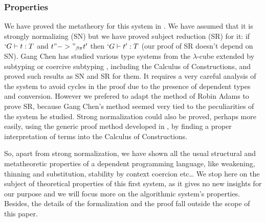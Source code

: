 \documentclass{llncs}
\begin{document}
\subsubsection{Properties}
We have proved the metatheory for this system in \Coq{}
\cite{sozeau:Coq/Russell/meta-web}. We have assumed that it is strongly
normalizing (SN) but we have proved subject reduction (SR) for it: 
if $`G \vdash t : T$ and $t "->"_{\beta\pi} t'$ then $`G \vdash t' :
T$ (our proof of SR doesn't depend on SN).
Gang Chen \cite{ChenPhD} has studied various type systems from the
$\lambda$-cube extended by subtyping or coercive subtyping
\cite{DBLP:conf/csl/Luo96}, including the Calculus of Constructions, and
proved such results as SN and SR for them. It requires a very careful
analysis of the system to avoid cycles in the proof due to the presence
of dependent types and conversion. However we prefered to adapt the method of
Robin Adams \cite{adams:PTSEQ} to prove SR, because Gang Chen's method
seemed very tied to the peculiarities of the system he studied. 
Strong normalization could also be proved, perhaps more easily,
using the generic proof method developed in \cite{geuvers95}, by finding
a proper interpretation of \Russell terms into the Calculus of
Constructions.

So, apart from strong normalization, we have shown all the usual structural
and metatheoretic properties of a dependent programming language, like
weakening, thinning and substitution, stability by context coercion etc\ldots
We stop here on the subject of theoretical properties of this first system, as
it gives no new insights for our purpose and we will focus more on the
algorithmic system's properties. Besides, the details of the
formalization and the proof fall outside the scope of this paper.


\end{document}

